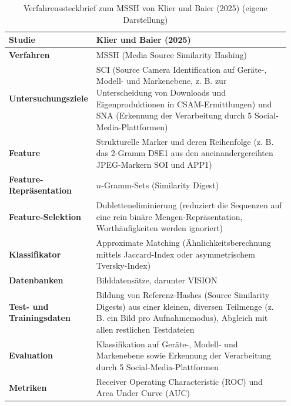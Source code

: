 \begin{table}[H]
    \centering
    \begin{tabular}{>{\raggedright\arraybackslash}p{0.2\linewidth}>{\raggedright\arraybackslash}p{0.75\linewidth}}\toprule
         \textbf{Studie}& Klier und Baier (2025)\cite{klier_media_2025}\\\midrule
         \textbf{Verfahren}& MSSH (Media Source Similarity Hashing)\\\midrule
         \textbf{Untersuchungsziele}& SCI (Source Camera Identification auf Geräte-, Modell- und Markenebene, z. B. zur Unterscheidung von Downloads und Eigenproduktionen in CSAM-Ermittlungen) und SNA (Erkennung der Verarbeitung durch 5 Social-Media-Plattformen)\\\midrule
         \textbf{Feature}& Strukturelle Marker und deren Reihenfolge (z. B. das 2-Gramm D8E1 aus den aneinandergereihten JPEG-Markern SOI und APP1)\\\midrule
         \textbf{Feature-Repräsentation}& \(n\)-Gramm-Sets (Similarity Digest)\\\midrule
         \textbf{Feature-Selektion}& Dubletteneliminierung (reduziert die Sequenzen auf eine rein binäre Mengen-Repräsentation, Worthäufigkeiten werden ignoriert)\\\midrule
         \textbf{Klassifikator}& Approximate Matching (Ähnlichkeitsberechnung mittels Jaccard-Index oder asymmetrischem Tversky-Index)\\\midrule
         \textbf{Datenbanken}& 7 Bilddatensätze, darunter VISION\\\midrule
         \textbf{Test- und Trainingsdaten}& Bildung von Referenz-Hashes (Source Similarity Digests) aus einer kleinen, diversen Teilmenge (z. B. ein Bild pro Aufnahmemodus), Abgleich mit allen restlichen Testdateien\\\midrule
         \textbf{Evaluation}&Klassifikation auf Geräte-, Modell- und Markenebene sowie Erkennung der Verarbeitung durch 5 Social-Media-Plattformen\\\midrule
         \textbf{Metriken}&Receiver Operating Characteristic (ROC) und Area Under Curve (AUC)\\ \bottomrule
    \end{tabular}
    \caption{Verfahrenssteckbrief zum MSSH von Klier und Baier (2025) \cite{klier_media_2025} (eigene Darstellung)}
    \label{tab:steckbrief-klier}
\end{table}